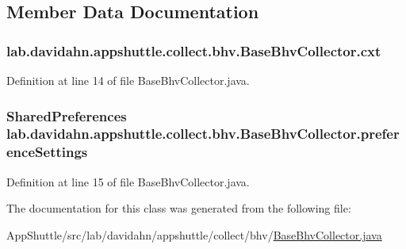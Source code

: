 \subsection{\-Member \-Data \-Documentation}
\hypertarget{classlab_1_1davidahn_1_1appshuttle_1_1collect_1_1bhv_1_1_base_bhv_collector_a0de552027d0f2521beb2344ce413ada5}{
\subsubsection[{cxt}]{ {\bf lab.\-davidahn.\-appshuttle.\-collect.\-bhv.\-Base\-Bhv\-Collector.\-cxt}}}\label{classlab_1_1davidahn_1_1appshuttle_1_1collect_1_1bhv_1_1_base_bhv_collector_a0de552027d0f2521beb2344ce413ada5}


\-Definition at line 14 of file \-Base\-Bhv\-Collector.\-java.

\hypertarget{classlab_1_1davidahn_1_1appshuttle_1_1collect_1_1bhv_1_1_base_bhv_collector_adb576a69ed10e145d7b2300e163fa4a7}{
\subsubsection[{preference\-Settings}]{\setlength{\rightskip}{0pt plus 5cm}\-Shared\-Preferences {\bf lab.\-davidahn.\-appshuttle.\-collect.\-bhv.\-Base\-Bhv\-Collector.\-preference\-Settings}}}\label{classlab_1_1davidahn_1_1appshuttle_1_1collect_1_1bhv_1_1_base_bhv_collector_adb576a69ed10e145d7b2300e163fa4a7}


\-Definition at line 15 of file \-Base\-Bhv\-Collector.\-java.



\-The documentation for this class was generated from the following file\-:\begin{DoxyCompactItemize}
\item 
\-App\-Shuttle/src/lab/davidahn/appshuttle/collect/bhv/\hyperlink{_base_bhv_collector_8java}{\-Base\-Bhv\-Collector.\-java}\end{DoxyCompactItemize}
